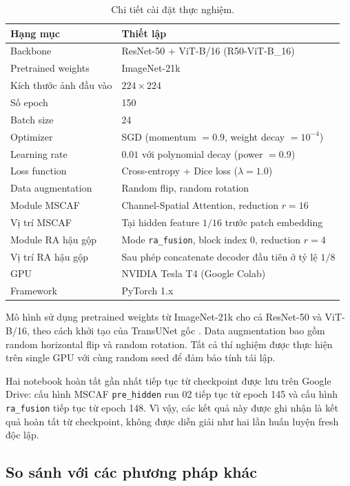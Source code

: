 \documentclass[10pt,a4paper]{article}
\begin{document}
\begin{table}[t]
\centering
\caption{Chi tiết cài đặt thực nghiệm.}
\label{tab:experimental-setup}
\small
\begin{tabularx}{\textwidth}{p{}Y}
\toprule
\textbf{Hạng mục} & \textbf{Thiết lập} \\
\midrule
Backbone & ResNet-50 + ViT-B/16 (R50-ViT-B\_16) \\
Pretrained weights & ImageNet-21k \\
Kích thước ảnh đầu vào & $224 \times 224$ \\
Số epoch & 150 \\
Batch size & 24 \\
Optimizer & SGD (momentum $= 0.9$, weight decay $= 10^{-4}$) \\
Learning rate & $0.01$ với polynomial decay (power $= 0.9$) \\
Loss function & Cross-entropy + Dice loss ($\lambda = 1.0$) \\
Data augmentation & Random flip, random rotation \\
Module MSCAF & Channel-Spatial Attention, reduction $r = 16$ \\
Vị trí MSCAF & Tại hidden feature $1/16$ trước patch embedding \\
Module RA hậu gộp & Mode \texttt{ra\_fusion}, block index $0$, reduction $r = 4$ \\
Vị trí RA hậu gộp & Sau phép concatenate decoder đầu tiên ở tỷ lệ $1/8$ \\
GPU & NVIDIA Tesla T4 (Google Colab) \\
Framework & PyTorch 1.x \\
\bottomrule
\end{tabularx}
\end{table}

Mô hình sử dụng pretrained weights từ ImageNet-21k cho cả ResNet-50 và ViT-B/16, theo cách khởi tạo của TransUNet gốc \cite{chen2021transunet}. Data augmentation bao gồm random horizontal flip và random rotation. Tất cả thí nghiệm được thực hiện trên single GPU với cùng random seed để đảm bảo tính tái lập.

Hai notebook hoàn tất gần nhất tiếp tục từ checkpoint được lưu trên Google Drive: cấu hình MSCAF \texttt{pre\_hidden} run 02 tiếp tục từ epoch 145 và cấu hình \texttt{ra\_fusion} tiếp tục từ epoch 148. Vì vậy, các kết quả này được ghi nhận là kết quả hoàn tất từ checkpoint, không được diễn giải như hai lần huấn luyện fresh độc lập.

\subsection{So sánh với các phương pháp khác}
\end{document}
